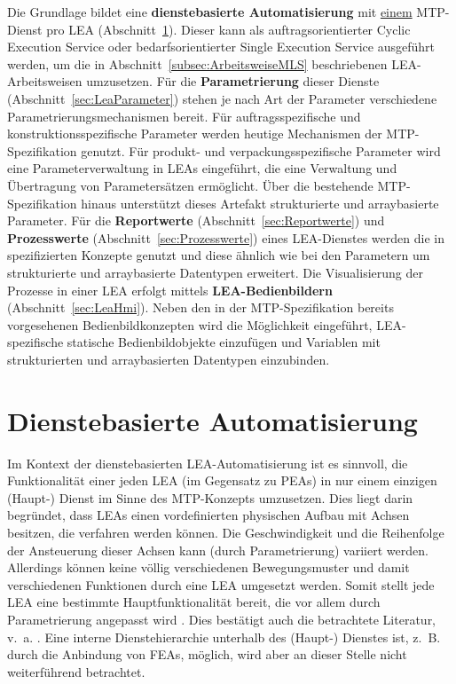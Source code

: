 Die Grundlage bildet eine \textbf{dienstebasierte Automatisierung} mit \underline{einem} MTP-Dienst pro LEA (Abschnitt~\ref{sec:LeaDienste}). Dieser kann als auftragsorientierter Cyclic Execution Service oder bedarfsorientierter Single Execution Service ausgeführt werden, um die in Abschnitt~\ref{subsec:ArbeitsweiseMLS} beschriebenen LEA-Arbeitsweisen umzusetzen. Für die \textbf{Parametrierung} dieser Dienste (Abschnitt~\ref{sec:LeaParameter}) stehen je nach Art der Parameter verschiedene Parametrierungsmechanismen bereit. Für auftragsspezifische und konstruktionsspezifische Parameter werden heutige Mechanismen der MTP-Spezifikation genutzt. Für produkt- und verpackungsspezifische Parameter wird eine Parameterverwaltung in LEAs eingeführt, die eine Verwaltung und Übertragung von Parametersätzen ermöglicht. Über die bestehende MTP-Spezifikation hinaus unterstützt dieses Artefakt strukturierte und arraybasierte Parameter. Für die \textbf{Reportwerte} (Abschnitt~\ref{sec:Reportwerte}) und \textbf{Prozesswerte} (Abschnitt~\ref{sec:Prozesswerte}) eines LEA-Dienstes werden die in \cite{PNO.2025.Part4} spezifizierten Konzepte genutzt und diese ähnlich wie bei den Parametern um strukturierte und arraybasierte Datentypen erweitert. Die Visualisierung der Prozesse in einer LEA erfolgt mittels \textbf{LEA-Bedienbildern} (Abschnitt~\ref{sec:LeaHmi}). Neben den in der MTP-Spezifikation bereits vorgesehenen Bedienbildkonzepten wird die Möglichkeit eingeführt, LEA-spezifische statische Bedienbildobjekte einzufügen und Variablen mit strukturierten und arraybasierten Datentypen einzubinden.

\section{Dienstebasierte Automatisierung}
\label{sec:LeaDienste}

Im Kontext der dienstebasierten LEA-Automatisierung ist es sinnvoll, die Funktionalität einer jeden LEA (im Gegensatz zu PEAs) in nur einem einzigen (Haupt-) Dienst im Sinne des MTP-Konzepts umzusetzen. Dies liegt darin begründet, dass LEAs einen vordefinierten physischen Aufbau mit Achsen besitzen, die verfahren werden können. Die Geschwindigkeit und die Reihenfolge der Ansteuerung dieser Achsen kann (durch Parametrierung) variiert werden. Allerdings können keine völlig verschiedenen Bewegungsmuster und damit verschiedenen Funktionen durch eine LEA umgesetzt werden. Somit stellt jede LEA eine bestimmte Hauptfunktionalität bereit, die vor allem durch Parametrierung angepasst wird \cite{Blumenstein.Designprinzipien}. Dies bestätigt auch die betrachtete Literatur, v.~a. \cite{InternationalSocietyofAutomation.2022,GrunerMTPPackMLatp.2022}. Eine interne Dienstehierarchie unterhalb des (Haupt-) Dienstes ist, z.~B. durch die Anbindung von FEAs, möglich, wird aber an dieser Stelle nicht weiterführend betrachtet. 


